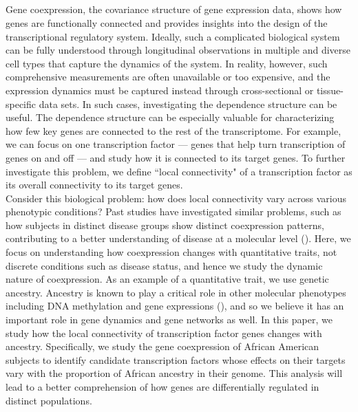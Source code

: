 \documentclass[aap,authoryear, preprint]{imsart}
\numberwithin{equation}{section}
\theoremstyle{plain}
\begin{document}
\subsection*{}
Gene coexpression, the covariance structure of gene expression data, shows how genes are functionally connected and provides insights into the design of the transcriptional regulatory system. Ideally, such a complicated biological system can be fully understood through longitudinal observations in multiple and diverse cell types that capture the dynamics of the system. In reality, however, such comprehensive measurements are often unavailable or too expensive, and the expression dynamics must be captured instead through cross-sectional or tissue-specific data sets. In such cases, investigating the dependence structure can be useful. The dependence structure can be especially valuable for characterizing how few key genes are connected to the rest of the transcriptome. For example, we can focus on one transcription factor --- genes that help turn transcription of genes on and off --- and study how it is connected to its target genes. To further investigate this problem, we define ``local connectivity" of a transcription factor as its overall connectivity to its target genes.\\

Consider this biological problem: how does local connectivity vary across various phenotypic conditions?  Past studies have investigated similar problems, such as how subjects in distinct disease groups show distinct coexpression patterns, contributing to a better understanding of disease at a molecular level (\cite{de2010differential}). Here, we focus on understanding how coexpression changes with quantitative traits, not discrete conditions such as disease status, and hence we study the dynamic nature of coexpression. As an example of a quantitative trait, we use genetic ancestry. Ancestry is known to play a critical role in other molecular phenotypes including DNA methylation and gene expressions (\cite{galanter2017differential, price2008effects}), and so we believe it has an important role in gene dynamics and gene networks as well. In this paper, we study how the local connectivity of transcription factor genes changes with ancestry. Specifically, we study the gene coexpression of African American subjects to identify candidate transcription factors whose effects on their targets vary with the proportion of African ancestry in their genome. This analysis will lead to a better comprehension of how genes are differentially regulated in distinct populations. \\
\end{document}
